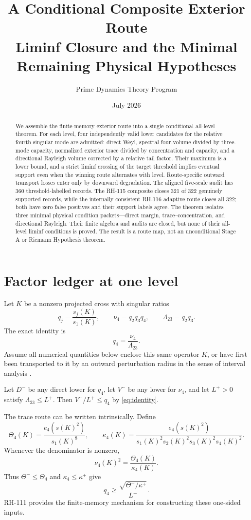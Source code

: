 \documentclass[12pt]{article}
\title{A Conditional Composite Exterior Route\\\large Liminf Closure and the Minimal Remaining Physical Hypotheses}
\author{Prime Dynamics Theory Program}
\date{July 2026}
\begin{document}
\maketitle

\begin{abstract}
We assemble the finite-memory exterior route into a single conditional
all-level theorem.  For each level, four independently valid lower
candidates for the relative fourth singular mode are admitted: direct Weyl,
spectral four-volume divided by three-mode capacity, normalized exterior
trace divided by concentration and capacity, and a directional Rayleigh
volume corrected by a relative tail factor.  Their maximum is a lower bound,
and a strict liminf crossing of the target threshold implies eventual
support even when the winning route alternates with level.  Route-specific
outward transport losses enter only by downward degradation.  The aligned
five-scale audit has 360 threshold-labelled records.  The RH-115 composite
closes 321 of 322 genuinely supported records, while the internally
consistent RH-116 adaptive route closes all 322; both have zero false
positives and their support labels agree.  The theorem isolates three
minimal physical condition packets---direct margin, trace--concentration,
and directional Rayleigh.  Their finite algebra and audits are closed, but
none of their all-level liminf conditions is proved.  The result is a route
map, not an unconditional Stage A or Riemann Hypothesis theorem.
\end{abstract}

\section{Factor ledger at one level}
Let $K$ be a nonzero projected cross with singular ratios
\[
 q_j=\frac{s_j(K)}{s_1(K)},\qquad
 \nu_4=q_2q_3q_4,
 \qquad \Lambda_{23}=q_2q_3.
\]
The exact identity is
\begin{equation}\label{eq:identity}
 q_4=\frac{\nu_4}{\Lambda_{23}}.
\end{equation}
Assume all numerical quantities below enclose this same operator $K$, or
have first been transported to it by an outward perturbation radius in the
sense of interval analysis \citep{Moore1966}.

Let $D^-$ be any direct lower for $q_4$, let $V^-$ be any lower for $\nu_4$,
and let $L^+>0$ satisfy $\Lambda_{23}\leq L^+$.  Then
$V^-/L^+\leq q_4$ by \eqref{eq:identity}.

The trace route can be written intrinsically.  Define
\[
 \Theta_4(K)=\frac{e_4(s(K)^2)}{s_1(K)^8},\qquad
 \kappa_4(K)=
 \frac{e_4(s(K)^2)}{s_1(K)^2s_2(K)^2s_3(K)^2s_4(K)^2}.
\]
Whenever the denominator is nonzero,
\begin{equation}\label{eq:traceidentity}
 \nu_4(K)^2=\frac{\Theta_4(K)}{\kappa_4(K)}.
\end{equation}
Thus $\Theta^-\leq\Theta_4$ and $\kappa_4\leq\kappa^+$ give
\[
 q_4\geq \frac{\sqrt{\Theta^-/\kappa^+}}{L^+}.
\]
RH-111 provides the finite-memory mechanism for constructing these one-sided
inputs.
\end{document}
